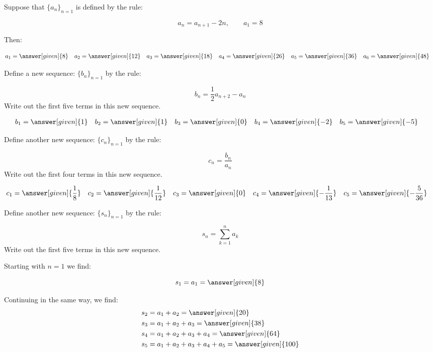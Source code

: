 \documentclass{ximera}
\author{Jim Talamo}
\begin{document}
\begin{exercise}

Suppose that $\{a_n\}_{n=1}$ is defined by the rule:

\[
 a_n = a_{n+1}-2n , \qquad a_1 = 8
\]

Then:

    \begin{align*}
       a_1 &= \answer[given]{8} & 
      a_2 &= \answer[given]{12} & 
      a_3 &= \answer[given]{18} & 
      a_4 &= \answer[given]{26} & 
      a_5 &= \answer[given]{36}  & 
      a_6 &= \answer[given]{48} 
    \end{align*}

\begin{exercise}
Define a new sequence: $\{b_n\}_{n=1}$ by the rule:

\[
b_n = \frac{1}{2}a_{n+2} - a_n
\]
Write out the first five terms in this new sequence.
    
     \begin{align*}
     	b_1 &=  \answer[given]{1}  & 
      	b_2 &=  \answer[given]{1}  & 
	b_3 &= \answer[given]{0}  & 
	b_4 &= \answer[given]{-2}  & 
	b_5 &=  \answer[given]{-5}  & 
    \end{align*}
    

    
\end{exercise}

\begin{exercise}
Define another new sequence: $\{c_n\}_{n=1}$ by the rule:

\[
c_n = \frac{b_n}{a_n} 
\]
Write out the first four terms in this new sequence.

     \begin{align*}
     	c_1 &=  \answer[given]{\frac{1}{8}}  & 
      	c_2 &=  \answer[given]{\frac{1}{12}}  & 
	c_3 &= \answer[given]{0}   & 
	c_4 &= \answer[given]{-\frac{1}{13}}   & 
	c_5 &= \answer[given]{-\frac{5}{36}}   & 
    \end{align*}
    

\end{exercise}

\begin{exercise}
Define another new sequence: $\{s_n\}_{n=1}$ by the rule:

\[
s_n = \sum_{k=1}^n a_k 
\]
Write out the first five terms in this new sequence.

Starting with $n=1$ we find:

\[      s_1 = a_1 = \answer[given]{8}       \]
      
Continuing in the same way, we find:     
     \begin{align*}
      	s_2 &=  a_1 +a_2 = \answer[given]{20}  \\ 
	s_3 &=  a_1 +a_2 + a_3 = \answer[given]{38}   \\ 
	s_4 &=  a_1 +a_2 +a_3 +a_4= \answer[given]{64}  \\ 
	s_5 &=  a_1 +a_2 +a_3+a_4+a_5= \answer[given]{100}    
    \end{align*}

\end{exercise}   
    
    \end{exercise}
\end{document}
